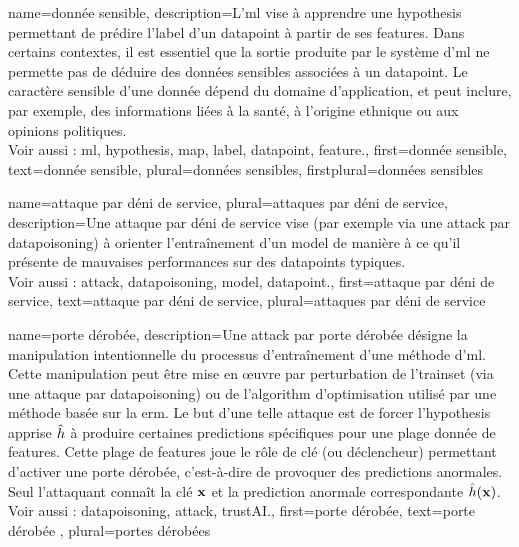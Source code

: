 {name={donnée sensible}, 
	description={L’\gls{ml} vise à apprendre une \gls{hypothesis} permettant de prédire l’\gls{label} d’un \gls{datapoint} à partir de ses \glspl{feature}. 
		Dans certains contextes, il est essentiel que la sortie produite par le système d’\gls{ml} ne permette pas de déduire des données sensibles associées à un \gls{datapoint}. 
		Le caractère sensible d’une donnée dépend du domaine d’application, et peut inclure, par exemple, des informations liées à la santé, à l’origine ethnique ou aux opinions politiques.
		\\ 
		Voir aussi : \gls{ml}, \gls{hypothesis}, \gls{map}, \gls{label}, \gls{datapoint}, \gls{feature}.},
	first={donnée sensible},
	text={donnée sensible}, plural={données sensibles}, firstplural={données sensibles}
}

{name={attaque par déni de service}, plural={attaques par déni de service},
	description={Une 
		attaque par déni de service vise (par exemple via une \gls{attack} par \gls{datapoisoning}) à orienter l’entraînement d’un \gls{model} 
		de manière à ce qu’il présente de mauvaises performances sur des \glspl{datapoint} typiques.
		\\
		Voir aussi : \gls{attack}, \gls{datapoisoning}, \gls{model}, \gls{datapoint}.},
	first={attaque par déni de service},
	text={attaque par déni de service}, plural={attaques par déni de service}
}

{name={porte dérobée}, 
	description={Une \gls{attack} par porte dérobée désigne la manipulation intentionnelle du processus d’entraînement d’une méthode d’\gls{ml}. 
		Cette manipulation peut être mise en œuvre par perturbation de l'\gls{trainset} (via une attaque par \gls{datapoisoning}) ou de l'\gls{algorithm} 
		d’optimisation utilisé par une méthode basée sur la \gls{erm}. Le but d’une telle attaque est de forcer l’\gls{hypothesis} apprise 
		$\hat{h}$ à produire certaines \glspl{prediction} spécifiques pour une plage donnée de \glspl{feature}. 
		Cette plage de \glspl{feature} joue le rôle de clé (ou déclencheur) permettant d’activer une porte dérobée, 
		c’est-à-dire de provoquer des \glspl{prediction} anormales. Seul l’attaquant connaît la clé ${\bf x}$ et la 
		\gls{prediction} anormale correspondante $\hat{h}({\bf x})$.
		\\
		Voir aussi : \gls{datapoisoning}, \gls{attack}, \gls{trustAI}.},
	first={porte dérobée},
	text={porte dérobée} , plural={portes dérobées}
}

